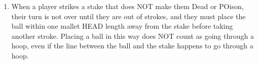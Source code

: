\documentclass[a4paper]{article}
\begin{document}
\begin{enumerate}
\item When a player strikes a stake that does NOT make them Dead or POison, their turn is not over until they are out of strokes, and they must place the ball within one mallet HEAD length away from the stake before taking another stroke. Placing a ball in this way does NOT count as going through a hoop, even if the line between the ball and the stake happens to go through a hoop.
\end{enumerate}
\end{document}
